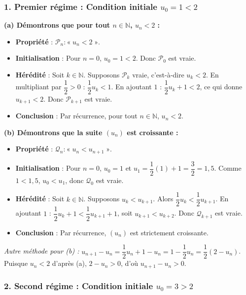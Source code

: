 \documentclass[11pt,a4paper]{article}
\newcommand{\N}{\mathbb{N}}
\begin{document}
\begin{correctionbox}
\subsubsection*{1. Premier régime : Condition initiale $u_0 = 1 < 2$}

\textbf{(a) Démontrons que pour tout $n \in \N$, $u_n < 2$ :}
\begin{itemize}
    \item \textbf{Propriété} : $\mathcal{P}_n : « \; u_n < 2 \; »$.
    \item \textbf{Initialisation} : Pour $n = 0$, $u_0 = 1 < 2$. Donc $\mathcal{P}_0$ est vraie.
    \item \textbf{Hérédité} : Soit $k \in \N$. Supposons $\mathcal{P}_k$ vraie, c'est-à-dire $u_k < 2$.
    En multipliant par $\dfrac{1}{2} > 0$ : $\dfrac{1}{2}u_k < 1$.
    En ajoutant $1$ : $\dfrac{1}{2}u_k + 1 < 2$, ce qui donne $u_{k+1} < 2$.
    Donc $\mathcal{P}_{k+1}$ est vraie.
    \item \textbf{Conclusion} : Par récurrence, pour tout $n \in \N$, $u_n < 2$.
\end{itemize}

\textbf{(b) Démontrons que la suite $(u_n)$ est croissante :}
\begin{itemize}
    \item \textbf{Propriété} : $\mathcal{Q}_n : « \; u_n < u_{n+1} \; »$.
    \item \textbf{Initialisation} : Pour $n = 0$, $u_0 = 1$ et $u_1 = \dfrac{1}{2}(1) + 1 = \dfrac{3}{2} = 1{,}5$. Comme $1 < 1{,}5$, $u_0 < u_1$, donc $\mathcal{Q}_0$ est vraie.
    \item \textbf{Hérédité} : Soit $k \in \N$. Supposons $u_k < u_{k+1}$.
    Alors $\dfrac{1}{2}u_k < \dfrac{1}{2}u_{k+1}$.
    En ajoutant $1$ : $\dfrac{1}{2}u_k + 1 < \dfrac{1}{2}u_{k+1} + 1$, soit $u_{k+1} < u_{k+2}$.
    Donc $\mathcal{Q}_{k+1}$ est vraie.
    \item \textbf{Conclusion} : Par récurrence, $(u_n)$ est strictement croissante.
\end{itemize}
\textit{Autre méthode pour (b) :} $u_{n+1} - u_n = \dfrac{1}{2}u_n + 1 - u_n = 1 - \dfrac{1}{2}u_n = \dfrac{1}{2}(2 - u_n)$. Puisque $u_n < 2$ d'après (a), $2 - u_n > 0$, d'où $u_{n+1} - u_n > 0$.

\subsubsection*{2. Second régime : Condition initiale $u_0 = 3 > 2$}


\end{correctionbox}
\end{document}
